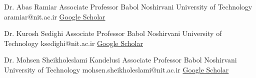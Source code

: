 %
%
%


\vspace{5pt}

\begin{referees}\label{supervisor}
  {Dr. Abas Ramiar}
  {Associate Professor}
  {Babol Noshirvani University of Technology}
  {aramiar@nit.ac.ir}
  {\href{https://scholar.google.com/citations?user=ew-WXvQAAAAJ}{Google Scholar}}

  {Dr. Kurosh Sedighi}
  {Associate Professor}
  {Babol Noshirvani University of Technology}
  {ksedighi@nit.ac.ir}
  {\href{https://scholar.google.com/citations?user=RlAAZdwAAAAJ}{Google Scholar}}

  {Dr. Mohsen Sheikholeslami Kandelusi}
  {Associate Professor}
  {Babol Noshirvani University of Technology}
  {mohsen.sheikholeslami@nit.ac.ir}
  {\href{https://scholar.google.com/citations?user=5cJ2aF0AAAAJ}{Google Scholar}}
\end{referees}
